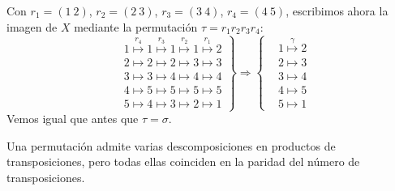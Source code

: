 \begin{ejemplo}
    Con $r_1 = (1\ 2)$, $r_2 = (2\ 3)$, $r_3 = (3\ 4)$, $r_4 = (4\ 5)$, escribimos ahora la imagen de $X$ mediante la permutación $\tau=r_1r_2r_3r_4$:
    \begin{equation*}
        \left.\begin{array}{cc}
            &1 \stackrel{r_4}{\longmapsto} 1 \stackrel{r_3}{\longmapsto} 1 \stackrel{r_2}{\longmapsto} 1 \stackrel{r_1}{\longmapsto} 2 \\
            &2 \longmapsto 2 \longmapsto 2 \longmapsto 3 \longmapsto 3 \\
            &3 \longmapsto 3 \longmapsto 4 \longmapsto 4 \longmapsto 4 \\
            &4 \longmapsto 5 \longmapsto 5 \longmapsto 5 \longmapsto 5 \\
            &5 \longmapsto 4 \longmapsto 3 \longmapsto 2 \longmapsto 1 
        \end{array}\right\} \Longrightarrow \left\{\begin{array}{cc}
            &1 \stackrel{\gamma}{\longmapsto} 2 \\
            &2 \longmapsto 3 \\
            &3 \longmapsto 4 \\
            &4 \longmapsto 5 \\
            &5 \longmapsto 1 
        \end{array}\right.
    \end{equation*}
    Vemos igual que antes que $\tau = \sigma$.
\end{ejemplo}

\begin{prop}
    Una permutación admite varias descomposiciones en productos de transposiciones, pero todas ellas coinciden en la paridad del número de transposiciones.
\end{prop}

